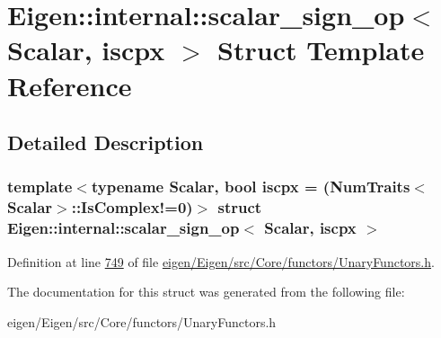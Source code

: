 \hypertarget{struct_eigen_1_1internal_1_1scalar__sign__op}{}\section{Eigen\+:\+:internal\+:\+:scalar\+\_\+sign\+\_\+op$<$ Scalar, iscpx $>$ Struct Template Reference}
\label{struct_eigen_1_1internal_1_1scalar__sign__op}


\subsection{Detailed Description}
\subsubsection*{template$<$typename Scalar, bool iscpx = (\+Num\+Traits$<$\+Scalar$>$\+::\+Is\+Complex!=0)$>$\newline
struct Eigen\+::internal\+::scalar\+\_\+sign\+\_\+op$<$ Scalar, iscpx $>$}



Definition at line \hyperlink{eigen_2_eigen_2src_2_core_2functors_2_unary_functors_8h_source_l00749}{749} of file \hyperlink{eigen_2_eigen_2src_2_core_2functors_2_unary_functors_8h_source}{eigen/\+Eigen/src/\+Core/functors/\+Unary\+Functors.\+h}.



The documentation for this struct was generated from the following file\+:\begin{DoxyCompactItemize}
\item 
eigen/\+Eigen/src/\+Core/functors/\+Unary\+Functors.\+h\end{DoxyCompactItemize}
